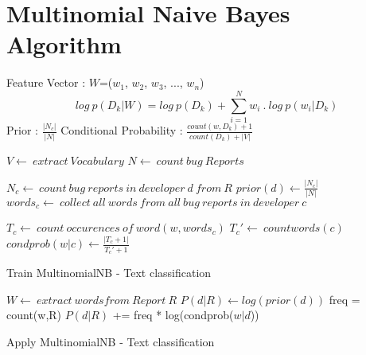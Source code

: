 \section{Multinomial Naive Bayes Algorithm}
Feature Vector :
		$W$=($w_1$, $w_2$, $w_3$, ..., $w_n$)
\begin{equation}
	log\ p(D_k|W) = log\ p(D_k) + \sum\limits^{N}_{i=1}w_i\ .\ log\ p(w_i|D_k)
\end{equation}
Prior : ${\frac{|N_c|}{|N|} }$
Conditional Probability : $\frac{count(w,D_k)+1}{count(D_k)+|V|}$		
\begin{algorithm}[H]
	\DontPrintSemicolon %
	$V \gets {\ extract\ Vocabulary}$ \;
    $N \gets {\ count\ bug\ Reports}$ \;

   
	{     
		$N_c \gets {\ count\ bug\ reports\ in\ developer\ d\ from\ R}$ \;
    		$prior(d) \gets {\frac{|N_c|}{|N|} }$ \;
    		$words_c \gets {\ collect\ all\ words\ from\ all\ bug\ reports\ in\ developer\ c}$ \;	
    	
    		{
    			$T_c \gets {\ count\ occurences\ of\ word(w,words_c)}$ \;
    			$T_c' \gets {\ count words(c)}$ \;
    			$condprob(w|c) \gets {\frac{|T_c+1|}{T_c' + 1 } }$ \;
    		} 
	}
	\;
	\caption{{\sc Train MultinomialNB} - Text classification}
	\label{algo:Train MNB}
\end{algorithm}
\newpage
\begin{algorithm}[H]
	\DontPrintSemicolon %
	$W \gets {\ extract\ words from\ Report\ R}$ \;
	{     
    		$P(d|R) \gets {log(prior(d))}$ \;
    		{
    			freq = count(w,R) \;
    			$P(d|R)$ += freq * log(condprob($w|d$))
	    	}
    }
	
	\;
	\caption{{\sc Apply MultinomialNB} - Text classification}
	\label{algo:Apply MNB}
\end{algorithm}

